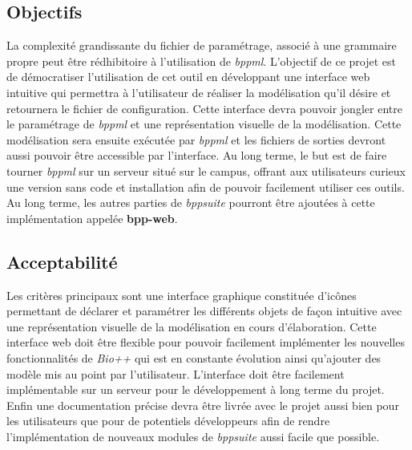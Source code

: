 	
\subsection{Objectifs}
	La complexité grandissante du fichier de paramétrage, associé à une grammaire propre peut être rédhibitoire à l'utilisation de \textit{bppml}. L'objectif de ce projet est de démocratiser l'utilisation de cet outil en développant une interface web intuitive qui permettra à l'utilisateur de réaliser la modélisation qu'il désire et retournera le fichier de configuration. Cette interface devra pouvoir jongler entre le paramétrage de \textit{bppml} et une représentation visuelle de la modélisation. Cette modélisation sera ensuite exécutée par \textit{bppml} et les fichiers de sorties devront aussi pouvoir être accessible par l'interface. Au long terme, le but est de faire tourner \textit{bppml} sur un serveur situé sur le campus, offrant aux utilisateurs curieux une version sans code et installation afin de pouvoir facilement utiliser ces outils. Au long terme, les autres parties de \textit{bppsuite} pourront être ajoutées à cette implémentation appelée \textbf{bpp-web}.
	
\subsection{Acceptabilité}
	Les critères principaux sont une interface graphique constituée d'icônes permettant de déclarer et paramétrer les différents objets de façon intuitive avec une représentation visuelle de la modélisation en cours d'élaboration. Cette interface web doit être flexible pour pouvoir facilement implémenter les nouvelles fonctionnalités de \textit{Bio++} qui est en constante évolution ainsi qu'ajouter des modèle mis au point par l'utilisateur. L'interface doit être facilement implémentable sur un serveur pour le développement à long terme du projet.
Enfin une documentation précise devra être livrée avec le projet aussi bien pour les utilisateurs que pour de potentiels développeurs
 afin de rendre l'implémentation de nouveaux modules de \textit{bppsuite} aussi facile que possible.
	

